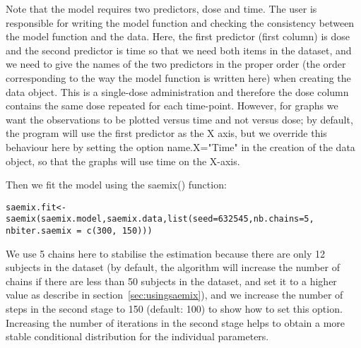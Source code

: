 Note that the model requires two predictors, dose and time. The user is responsible for writing the model function and checking the consistency between the model function and the data. Here, the first predictor (first column) is dose and the second predictor is time so that we need both items in the dataset, and we need to give the names of the two predictors in the proper order (the order corresponding to the way the model function is written here) when creating the data object. This is a single-dose administration and therefore the dose column contains the same dose repeated for each time-point. However, for graphs we want the observations to be plotted versus time and not versus dose; by default, the program will use the first predictor as the X axis, but we override this behaviour here by setting the option {\sf name.X="Time"} in the creation of the data object, so that the graphs will use time on the X-axis.

Then we fit the model using the {\sf saemix()} function:
\begin{verbatim}
saemix.fit<-saemix(saemix.model,saemix.data,list(seed=632545,nb.chains=5,
nbiter.saemix = c(300, 150)))
\end{verbatim}
We use 5 chains here to stabilise the estimation because there are only 12 subjects in the dataset (by default, the algorithm will increase the number of chains if there are less than 50 subjects in the dataset, and set it to a higher value as describe in section~\ref{sec:usingsaemix}), and we increase the number of steps in the second stage to 150 (default: 100) to show how to set this option. Increasing the number of iterations in the second stage helps to obtain a more stable conditional distribution for the individual parameters.

